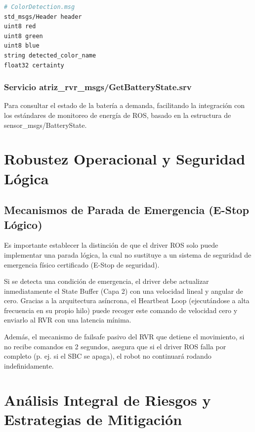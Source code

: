 \documentclass[11pt]{article}
\newcommand{\code}[1]{\textcolor{codeblue}{\url{#1}}}
\numberwithin{figure}{section}
\numberwithin{table}{section}
\def\code#1{#1}%
\begin{document}
\begin{lstlisting}[language=bash]
# ColorDetection.msg
std_msgs/Header header
uint8 red
uint8 green
uint8 blue
string detected_color_name
float32 certainty
\end{lstlisting}


\subsubsection{Servicio atriz\_rvr\_msgs/GetBatteryState.srv}

Para consultar el estado de la batería a demanda, facilitando la integración con los estándares de monitoreo de energía de ROS, basado en la estructura de \code{sensor\_msgs/BatteryState}.


\newpage


\section{Robustez Operacional y Seguridad Lógica}
\label{sec:seguridad_logica}


\subsection{Mecanismos de Parada de Emergencia (E-Stop Lógico)}

Es importante establecer la distinción de que el driver ROS solo puede implementar una parada lógica, la cual no sustituye a un sistema de seguridad de emergencia físico certificado (E-Stop de seguridad).

Si se detecta una condición de emergencia, el driver debe actualizar inmediatamente el State Buffer (Capa 2) con una velocidad lineal y angular de cero. Gracias a la arquitectura asíncrona, el Heartbeat Loop (ejecutándose a alta frecuencia en su propio hilo) puede recoger este comando de velocidad cero y enviarlo al RVR con una latencia mínima.

Además, el mecanismo de failsafe pasivo del RVR que detiene el movimiento, si no recibe comandos en 2 segundos, asegura que si el driver ROS falla por completo (p. ej. si el SBC se apaga), el robot no continuará rodando indefinidamente.


\newpage


\section{Análisis Integral de Riesgos y Estrategias de Mitigación}
\label{sec:analisis_riesgos}
\end{document}
